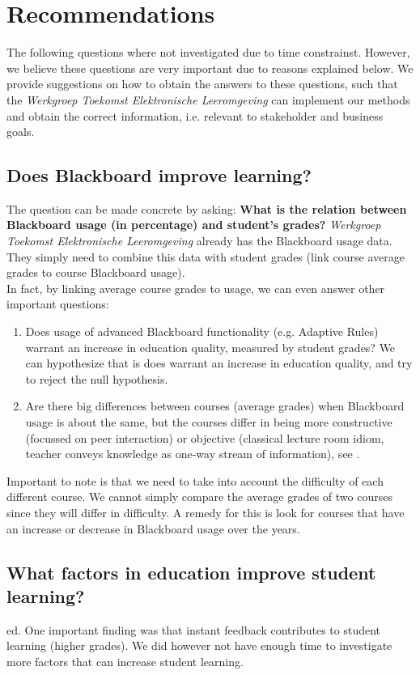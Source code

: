 \chapter{Recommendations}
The following questions where not investigated due to time constrainst. However, we believe these questions are very important due to reasons explained below. We provide suggestions on how to obtain the answers to these questions, such that the \textit{Werkgroep Toekomst Elektronische Leeromgeving} can implement our methods and obtain the correct information, i.e. relevant to stakeholder and business goals.

\section{Does Blackboard improve learning?}
The question can be made concrete by asking:\textbf{ What is the relation between Blackboard usage (in percentage) and student's grades?} \textit{Werkgroep Toekomst Elektronische Leeromgeving} already has the Blackboard usage data. They simply need to combine this data with student grades (link course average grades to course Blackboard usage). \\

In fact, by linking average course grades to usage, we can even answer other important questions:
\begin{enumerate}
	\item Does usage of advanced Blackboard functionality (e.g. Adaptive Rules) warrant an increase in education quality, measured by student grades? We can hypothesize that is does warrant an increase in education quality, and try to reject the null hypothesis.
	\item Are there big differences between courses (average grades) when Blackboard usage is about the same, but the courses differ in being more constructive (focussed on peer interaction) or objective (classical lecture room idiom, teacher conveys knowledge as one-way stream of information), see \cite{improveEducationWithIt}. 
\end{enumerate}

Important to note is that we need to take into account the difficulty of each different course. We cannot simply compare the average grades of two courses since they will differ in difficulty. A remedy for this is look for courses that have an increase or decrease in Blackboard usage over the years. 
\section{What factors in education improve student learning?}
ed. One important finding was that instant feedback contributes to student learning (higher grades). We did however not have enough time to investigate more factors that can increase student learning. 

